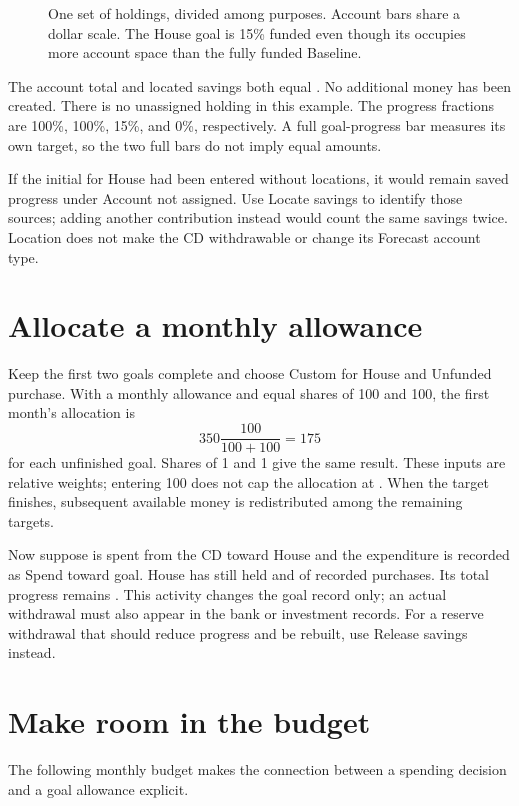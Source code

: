 

\begin{figure}[htbp]
\centering
\caption{One set of holdings, divided among purposes. Account bars share a dollar scale. The  House goal is 15\% funded even though its  occupies more account space than the fully funded Baseline.}
\label{fig:funding}
\end{figure}

The account total and located savings both equal \money{\GoalHeldBefore}. No additional money has been created. There is no unassigned holding in this example. The progress fractions are 100\%, 100\%, 15\%, and 0\%, respectively. A full goal-progress bar measures its own target, so the two full bars do not imply equal amounts.

If the initial  for House had been entered without locations, it would remain saved progress under Account not assigned. Use Locate savings to identify those sources; adding another contribution instead would count the same savings twice. Location does not make the CD withdrawable or change its Forecast account type.

\section{Allocate a monthly allowance}
Keep the first two goals complete and choose Custom for House and Unfunded purchase. With a  monthly allowance and equal shares of 100 and 100, the first month's allocation is
\[
 350\frac{100}{100+100}=175
\]
for each unfinished goal. Shares of 1 and 1 give the same result. These inputs are relative weights; entering 100 does not cap the allocation at . When the  target finishes, subsequent available money is redistributed among the remaining targets.

Now suppose  is spent from the CD toward House and the expenditure is recorded as Spend toward goal. House has \money{\HouseHeldAfter} still held and  of recorded purchases. Its total progress remains . This activity changes the goal record only; an actual withdrawal must also appear in the bank or investment records. For a reserve withdrawal that should reduce progress and be rebuilt, use Release savings instead.

\section{Make room in the budget}
The following monthly budget makes the connection between a spending decision and a goal allowance explicit.

